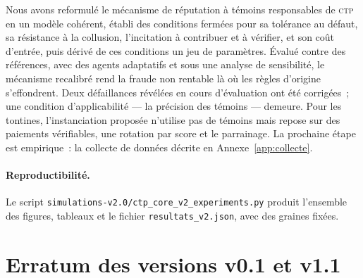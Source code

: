 \documentclass[11pt,a4paper]{article}
\theoremstyle{plain}
\theoremstyle{definition}
\theoremstyle{remark}
\newcommand{\CTP}{\textsc{ctp}}
\newcommand{\1}{\mathbf{1}}
\begin{document}
Nous avons reformulé le mécanisme de réputation à témoins responsables de
\CTP{} en un modèle cohérent, établi des conditions fermées pour sa tolérance au
défaut, sa résistance à la collusion, l'incitation à contribuer et à vérifier,
et son coût d'entrée, puis dérivé de ces conditions un jeu de paramètres.
Évalué contre des références, avec des agents adaptatifs et sous une analyse de
sensibilité, le mécanisme recalibré rend la fraude non rentable là où les règles
d'origine s'effondrent. Deux défaillances révélées en cours d'évaluation ont été
corrigées~; une condition d'applicabilité --- la précision des témoins --- demeure.
Pour les tontines, l'instanciation proposée n'utilise pas de témoins mais
repose sur des paiements vérifiables, une rotation par score et le parrainage.
La prochaine étape est empirique~: la collecte de données décrite en
Annexe~\ref{app:collecte}.

\paragraph{Reproductibilité.} Le script
\texttt{simulations-v2.0/ctp\_core\_v2\_experiments.py}
produit l'ensemble des figures, tableaux et le fichier
\texttt{resultats\_v2.json}, avec des graines fixées.

\appendix
\section{Erratum des versions v0.1 et v1.1}
\label{app:erratum}
\end{document}
